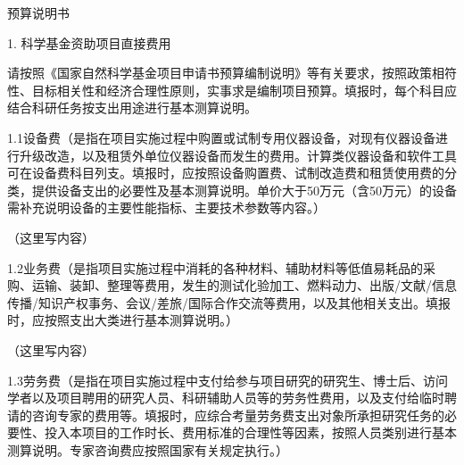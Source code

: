 \documentclass[12pt, a4paper]{ctexart}
\newcommand{\fangsonggb}{\CJKfamily{fsgb}}
\newcommand{\instruction}[1]{{\fangsonggb\linespread{1.3}\selectfont\setlength{\parskip}{8bp} #1 \par}}
\begin{document}
{\noindent\centering\heiti{} 预算说明书\par}

\begin{mdframed}[
    linecolor=black,
    linewidth=0.5pt,
    backgroundcolor=white,
    roundcorner=0pt,
    everyline=true,
    userdefinedwidth=16.09cm,
    leftmargin=-0.725cm,
    rightmargin=0.725cm,
    innertopmargin=0cm,
    innerbottommargin=0.2cm,
    innerleftmargin=0.05cm,
    innerrightmargin=0.05cm
]
\songti\fontsize{9bp}{9pt}\selectfont
\setlength{\parindent}{2em}

{\bfseries\indent\fangsonggb

1. 科学基金资助项目直接费用\par

请按照《国家自然科学基金项目申请书预算编制说明》等有关要求，按照政策相符性、目标相关性和经济合理性原则，实事求是编制项目预算。填报时，每个科目应结合科研任务按支出用途进行基本测算说明。}

\vspace{0.5em}

\instruction{1.1\hspace{0.75em}设备费（是指在项目实施过程中购置或试制专用仪器设备，对现有仪器设备进行升级改造，以及租赁外单位仪器设备而发生的费用。计算类仪器设备和软件工具可在设备费科目列支。填报时，应按照设备购置费、试制改造费和租赁使用费的分类，提供设备支出的必要性及基本测算说明。单价大于50万元（含50万元）的设备需补充说明设备的主要性能指标、主要技术参数等内容。）}
\vspace{0.3em}

（这里写内容）

\instruction{1.2\hspace{0.75em}业务费（是指项目实施过程中消耗的各种材料、辅助材料等低值易耗品的采购、运输、装卸、整理等费用，发生的测试化验加工、燃料动力、出版/文献/信息传播/知识产权事务、会议/差旅/国际合作交流等费用，以及其他相关支出。填报时，应按照支出大类进行基本测算说明。）}
\vspace{0.3em}

（这里写内容）

\instruction{1.3\hspace{0.75em}劳务费（是指在项目实施过程中支付给参与项目研究的研究生、博士后、访问学者以及项目聘用的研究人员、科研辅助人员等的劳务性费用，以及支付给临时聘请的咨询专家的费用等。填报时，应综合考量劳务费支出对象所承担研究任务的必要性、投入本项目的工作时长、费用标准的合理性等因素，按照人员类别进行基本测算说明。专家咨询费应按照国家有关规定执行。）}
\vspace{0.3em}


\end{mdframed}
\end{document}
